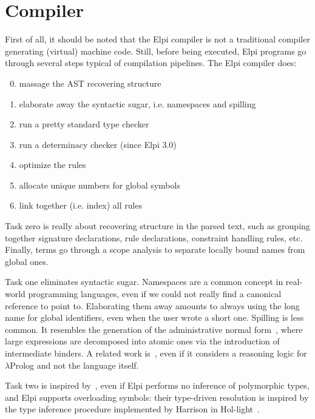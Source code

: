 \documentclass[a4paper, 11pt]{book}
\begin{document}
\section{Compiler}\label{sec:compiler}


First of all, it should be noted that the Elpi compiler is not a traditional
compiler generating (virtual) machine code. Still, before being executed, Elpi
programs go through several steps typical of compilation pipelines. The Elpi
compiler does:

\begin{enumerate}
  \setcounter{enumi}{-1}
  \item massage the AST recovering structure
  \item elaborate away the syntactic sugar, i.e. namespaces and spilling
  \item run a pretty standard type checker
  \item run a determinacy checker (since Elpi 3.0)
  \item optimize the rules
  \item allocate unique numbers for global symbols
  \item link together (i.e. index) all rules
\end{enumerate}

\noindent

Task zero is really about recovering structure in the parsed text, such as
grouping together signature declarations, rule declarations, constraint
handling rules, etc. Finally, terms go through a scope analysis to separate
locally bound names from global ones.


Task one eliminates syntactic sugar. Namespaces are a common concept in
real-world programming languages, even if we could not really find a canonical
reference to point to. Elaborating them away amounts to always using the long
name for global identifiers, even when the user wrote a short one. Spilling is
less common. It resembles the generation of the administrative normal
form~\cite{10.1145/141478.141563}, where large expressions are decomposed
into atomic ones via the introduction of intermediate binders. A related work
is~\cite{chaudhuri:hal-01806154}, even if it considers a reasoning logic for
$\lambda$Prolog and not the language itself.


Task two is inspired by~\cite{10.5555/868728}, even if Elpi performs no
inference of polymorphic types, and Elpi supports overloading symbols: their
type-driven resolution is inspired by the type inference procedure implemented
by Harrison in Hol-light~\cite{10.1007/978-3-642-03359-9_4}.
\end{document}
